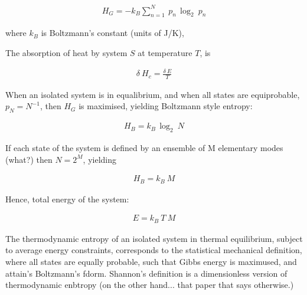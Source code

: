 \documentclass{ametsoc}
\begin{document}
\begin{align}
H_G = -k_B \sum_{n=1}^{N}~p_n\,\log_2~p_n
\end{align}

where $k_B$ is Boltzmann's constant (units of J/K), 

The absorption of heat by system $S$ at temperature $T$, is


\begin{align}
\delta~H_c = \frac{\delta~E}{T}
\end{align}

When an isolated system is in equalibrium, and when all states are equiprobable, $p_N = N^{-1}$, then $H_G$ is maximised, yielding Boltzmann style entropy:


\begin{align}
	H_B = k_B\,\log_2~N
\end{align}

If each state of the system is defined by an ensemble of M elementary modes (what?) then $N = 2^M$, yielding

\begin{align}
	H_B = k_B~M
\end{align}

Hence, total energy of the system:

\begin{align}
	E = k_B~T~M
\end{align}

The thermodynamic entropy of an isolated system in thermal equilibrium, subject to average energy constraints, corresponds to the statistical mechanical definition, where all states are equally probable, such that Gibbs energy is maximused, and attain's Boltzmann's fdorm. Shannon's definition is a dimensionless version of thermodynamic enbtropy (on the other hand... that paper that says otherwise.)












\acknowledgments
\end{document}
